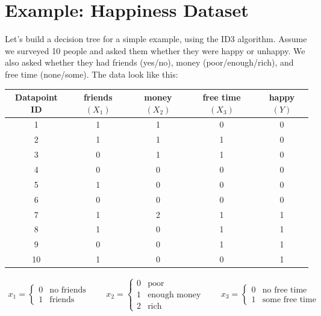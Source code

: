 
\section{Example: Happiness Dataset}

Let's build a decision tree for a simple example, using the ID3 algorithm. Assume we surveyed 10 people and asked them whether they were happy or unhappy. We also asked whether they had friends (yes/no), money (poor/enough/rich), and free time (none/some). The data look like this:

{\small
\begin{center}
\begin{tabular}{ccccc}
\toprule
Datapoint ID & friends $(X_1)$ & money $(X_2)$ & free time $(X_3)$ & happy $(Y)$ \\
\midrule
1 & 1 & 1 & 0 & 0 \\
2 & 1 & 1 & 1 & 0 \\
3 & 0 & 1 & 1 & 0 \\
4 & 0 & 0 & 0 & 0 \\
5 & 1 & 0 & 0 & 0 \\
6 & 0 & 0 & 0 & 0 \\
\midrule
7 & 1 & 2 & 1 & 1 \\
8 & 1 & 0 & 1 & 1 \\
9 & 0 & 0 & 1 & 1 \\
10 & 1 & 0 & 0 & 1 \\
\bottomrule
\end{tabular}

\begin{align*}
	x_1 = \left\{ \begin{array}{cc} 0 & \text{no friends} \\ 1 & \text{friends} \end{array} \right.
	\qquad
	x_2 = \left\{ \begin{array}{cc} 0 & \text{poor} \\ 1 & \text{enough money} \\ 2 & \text{rich} \end{array} \right.
	\qquad
	x_3 = \left\{ \begin{array}{cc} 0 & \text{no free time} \\ 1 & \text{some free time} \end{array} \right.
\end{align*}
\end{center}
}

